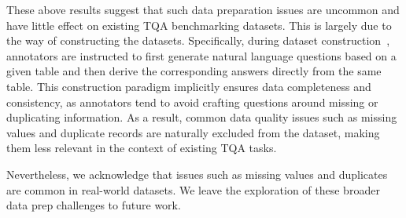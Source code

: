 These above results suggest that such data preparation issues are uncommon and have little effect on existing TQA benchmarking datasets. This is largely due to the way of constructing the datasets. Specifically, during dataset construction~\cite{chen2019tabfact, pasupat2015compositional, wu2024tablebench}, annotators are instructed to first generate natural language questions based on a given table and then derive the corresponding answers directly from the same table. This construction paradigm implicitly ensures data completeness and consistency, as annotators tend to avoid crafting questions around missing or duplicating information. As a result, common data quality issues such as missing values and duplicate records are naturally excluded from the dataset, making them less relevant in the context of existing TQA tasks.

Nevertheless, we acknowledge that issues such as missing values and duplicates are common in real-world datasets. We leave the exploration of these broader data prep challenges to future work.




